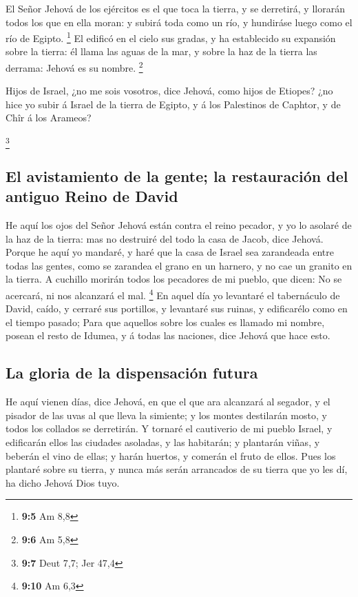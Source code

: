  El Señor Jehová de los ejércitos es el que toca la tierra,
y se derretirá, y llorarán todos los que en ella moran: y subirá toda
como un río, y hundiráse luego como el río de Egipto. \footnote{\textbf{9:5}
  Am 8,8}  El edificó en el cielo sus gradas, y ha
establecido su expansión sobre la tierra: él llama las aguas de la mar,
y sobre la haz de la tierra las derrama: Jehová es su nombre.
\footnote{\textbf{9:6} Am 5,8}

 Hijos de Israel, ¿no me sois vosotros, dice Jehová, como
hijos de Etiopes? ¿no hice yo subir á Israel de la tierra de Egipto, y á
los Palestinos de Caphtor, y de Chîr á los Arameos?

\footnote{\textbf{9:7} Deut 7,7; Jer 47,4}

\hypertarget{el-avistamiento-de-la-gente-la-restauraciuxf3n-del-antiguo-reino-de-david}{%
\subsection{El avistamiento de la gente; la restauración del antiguo
Reino de
David}\label{el-avistamiento-de-la-gente-la-restauraciuxf3n-del-antiguo-reino-de-david}}

 He aquí los ojos del Señor Jehová están contra el reino
pecador, y yo lo asolaré de la haz de la tierra: mas no destruiré del
todo la casa de Jacob, dice Jehová.  Porque he aquí yo
mandaré, y haré que la casa de Israel sea zarandeada entre todas las
gentes, como se zarandea el grano en un harnero, y no cae un granito en
la tierra.  A cuchillo morirán todos los pecadores de mi
pueblo, que dicen: No se acercará, ni nos alcanzará el mal. \footnote{\textbf{9:10}
  Am 6,3}  En aquel día yo levantaré el tabernáculo de
David, caído, y cerraré sus portillos, y levantaré sus ruinas, y
edificarélo como en el tiempo pasado;  Para que aquellos
sobre los cuales es llamado mi nombre, posean el resto de Idumea, y á
todas las naciones, dice Jehová que hace esto.

\hypertarget{la-gloria-de-la-dispensaciuxf3n-futura}{%
\subsection{La gloria de la dispensación
futura}\label{la-gloria-de-la-dispensaciuxf3n-futura}}

 He aquí vienen días, dice Jehová, en que el que ara
alcanzará al segador, y el pisador de las uvas al que lleva la simiente;
y los montes destilarán mosto, y todos los collados se derretirán.
 Y tornaré el cautiverio de mi pueblo Israel, y edificarán
ellos las ciudades asoladas, y las habitarán; y plantarán viñas, y
beberán el vino de ellas; y harán huertos, y comerán el fruto de ellos.
 Pues los plantaré sobre su tierra, y nunca más serán
arrancados de su tierra que yo les dí, ha dicho Jehová Dios tuyo.
